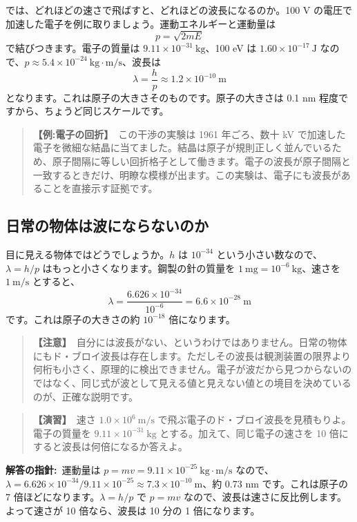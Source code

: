 \documentclass{article}
\begin{document}
では、どれほどの速さで飛ばすと、どれほどの波長になるのか。100 V の電圧で加速した電子を例に取りましょう。運動エネルギーと運動量は
\[ p = \sqrt{2 m E} \]
で結びつきます。電子の質量は \(9.11 \times 10^{-31} \ \mathrm{kg} \)、100 eV は \(1.60 \times 10^{-17} \ \mathrm{J} \) なので、\(p \approx 5.4 \times 10^{-24} \ \mathrm{kg \cdot m/s} \)、波長は
\[ \lambda = \frac{h}{p} \approx 1.2 \times 10^{-10} \ \mathrm{m} \]
となります。これは原子の大きさそのものです。原子の大きさは 0.1 nm 程度ですから、ちょうど同じスケールです。

\begin{quote}
\textbf{【例:電子の回折】}\ この干渉の実験は 1961 年ごろ、数十 kV で加速した電子を微細な結晶に当てました。結晶は原子が規則正しく並んでいるため、原子間隔に等しい回折格子として働きます。電子の波長が原子間隔と一致するときだけ、明瞭な模様が出ます。この実験は、電子にも波長があることを直接示す証拠です。
\end{quote}

\subsection{日常の物体は波にならないのか}

目に見える物体ではどうでしょうか。\(h\) は \(10^{-34}\) という小さい数なので、\(\lambda = h / p\) はもっと小さくなります。鋼製の針の質量を \(1 \ \mathrm{mg} = 10^{-6} \ \mathrm{kg} \)、速さを \(1 \ \mathrm{m/s} \) とすると、
\[ \lambda = \frac{6.626 \times 10^{-34}}{10^{-6}} = 6.6 \times 10^{-28} \ \mathrm{m} \]
です。これは原子の大きさの約 \(10^{-18}\) 倍になります。

\begin{quote}
\textbf{【注意】}\ 自分には波長がない、というわけではありません。日常の物体にもド・ブロイ波長は存在します。ただしその波長は観測装置の限界より何桁も小さく、原理的に検出できません。電子が波だから見つからないのではなく、同じ式が波として見える値と見えない値との境目を決めているのが、正確な説明です。
\end{quote}

\begin{quote}
\textbf{【演習】}\ 速さ \(1.0 \times 10^{6} \ \mathrm{m/s} \) で飛ぶ電子のド・ブロイ波長を見積もりよ。電子の質量を \(9.11 \times 10^{-31} \ \mathrm{kg} \) とする。加えて、同じ電子の速さを 10 倍にすると波長は何倍になるか答えよ。
\end{quote}

\textbf{解答の指針:}\ 運動量は \(p = mv = 9.11 \times 10^{-25} \ \mathrm{kg \cdot m/s} \) なので、\(\lambda = 6.626 \times 10^{-34} / 9.11 \times 10^{-25} \approx 7.3 \times 10^{-10} \ \mathrm{m}\)、約 0.73 nm です。これは原子の 7 倍ほどになります。\( \lambda = h / p \) で \(p = mv\) なので、波長は速さに反比例します。よって速さが 10 倍なら、波長は 10 分の 1 倍になります。
\end{document}
